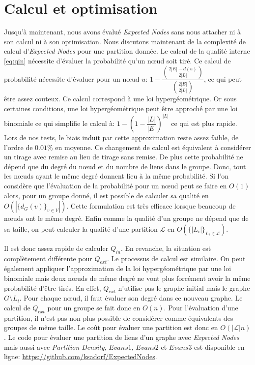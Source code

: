 \section{Calcul et optimisation}
Jusqu'à maintenant, nous avons évalué \emph{Expected Nodes} sans nous attacher ni à son calcul ni à son optimisation.
Nous discutons maintenant de la complexité de calcul d'\emph{Expected Nodes} pour une partition donnée.
Le calcul de la qualité interne \ref{eq:qin} nécessite d'évaluer la probabilité qu'un n\oe ud soit tiré.
Ce calcul de probabilité nécessite d'évaluer pour un n\oe ud $u$: $1 - \dfrac{ \binom{2|E|-d(u)}{2|L|} }{ \binom{2|E|}{2|L|} }$, ce qui peut être assez couteux.
Ce calcul correspond à une loi hypergéométrique.
Or sous certaines conditions, une loi hypergéométrique peut être approché par une loi binomiale ce qui simplifie le calcul à: $1 - (1- \dfrac{|L|}{|E|})^{|L|}$ ce qui est plus rapide.
Lors de nos tests, le biais induit par cette approximation reste assez faible, de l'ordre de $0.01\%$ en moyenne.
Ce changement de calcul est équivalent à considérer un tirage avec remise au lieu de tirage sans remise.
De plus cette probabilité ne dépend que du degré du n\oe ud et du nombre de liens dans le groupe.
Donc, tout les n\oe uds ayant le même degré donnent lieu à la même probabilité.
Si l'on considère que l'évaluation de la probabilité pour un n\oe ud peut se faire en $O(1)$ alors, pour un groupe donné, il est possible de calculer sa qualité en $O(|\{d_G(v)\}_{v \in V}|)$.
Cette formulation est très efficace lorsque beaucoup de n\oe uds ont le même degré.
Enfin comme la qualité d'un groupe ne dépend que de sa taille, on peut calculer la qualité d'une partition $\mathcal{L}$ en $O(\{|L_i|\}_{L_i \in \mathcal{L}})$.

Il est donc assez rapide de calculer $Q_{in}$.
En revanche, la situation est complètement différente pour $Q_{ext}$.
Le processus de calcul est similaire.
On peut également appliquer l'approximation de la loi hypergéométrique par une loi binomiale mais deux n\oe uds de même degré ne vont plus forcément avoir la même probabilité d'être tirés.
En effet, $Q_{ext}$ n'utilise pas le graphe initial mais le graphe $G\setminus L_i$.
Pour chaque n\oe ud, il faut évaluer son degré dans ce nouveau graphe.
Le calcul de $Q_{ext}$ pour un groupe se fait donc en $O(n)$.
Pour l'évaluation d'une partition, il n'est pas non plus possible de considérer comme équivalents des groupes de même taille.
Le coût pour évaluer une partition est donc en $O(|\mathcal{L}|n)$.
Le code pour évaluer une partition de liens d'un graphe avec \emph{Expected Nodes} mais aussi avec \emph{Partition Density}, $Evans1$, $Evans2$ et $Evans3$ est disponible en ligne: \url{https://github.com/ksadorf/ExpectedNodes}.


